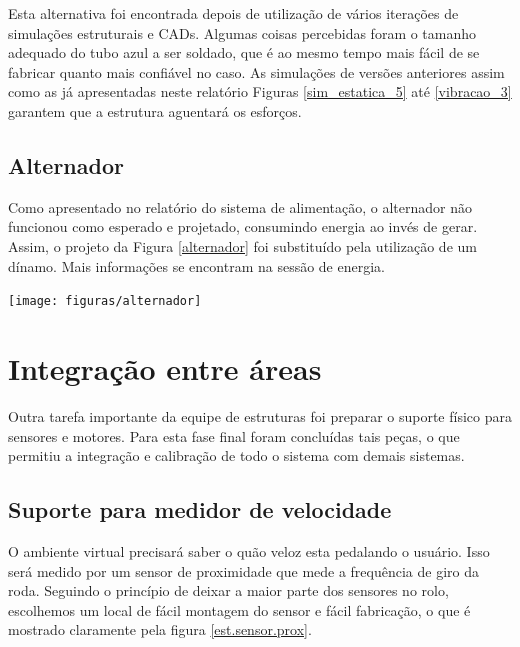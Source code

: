 
    Esta alternativa foi encontrada depois de utilização de vários iterações de simulações estruturais e CADs. Algumas coisas percebidas foram o tamanho adequado do tubo azul a ser soldado, que é ao mesmo tempo mais fácil de se fabricar quanto mais confiável no caso. As simulações de versões anteriores assim como as já apresentadas neste relatório Figuras \ref{sim_estatica_5} até \ref{vibracao_3} garantem que a estrutura aguentará os esforços.

\subsection{Alternador}
 
    Como apresentado no relatório do sistema de alimentação, o alternador não funcionou como esperado e projetado, consumindo energia ao invés de gerar. Assim, o projeto da Figura \ref{alternador} foi substituído pela utilização de um dínamo. Mais informações se encontram na sessão de energia.

    \begin{center}
        \texttt{[image: figuras/alternador]}
        \label{alternador}
    \end{center} 
    
  \section{Integração entre áreas} \label{secao.integracao}
    
    Outra tarefa importante da equipe de estruturas foi preparar o suporte físico para sensores e motores. Para esta fase final foram concluídas tais peças, o que permitiu a integração e calibração de todo o sistema com demais sistemas.   
  
  \subsection{Suporte para medidor de velocidade}
  
  O ambiente virtual precisará saber o quão veloz esta pedalando o usuário. Isso será medido por um sensor de proximidade que mede a frequência de giro da roda. Seguindo o princípio de deixar a maior parte dos sensores no rolo, escolhemos um local de fácil montagem do sensor e fácil fabricação, o que é mostrado claramente pela figura \ref{est.sensor.prox}.
  
